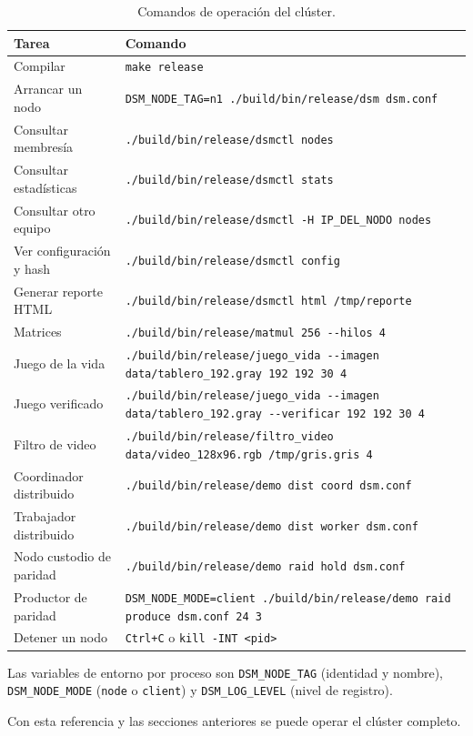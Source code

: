 \begin{table}[H]
\centering
\footnotesize
\caption{Comandos de operación del clúster.}
\label{tab:comandos}
\begin{tabularx}{\textwidth}{@{}P{3.2cm} Y@{}}
\toprule
Tarea & Comando \\
\midrule
Compilar & \texttt{make release} \\
Arrancar un nodo & \texttt{DSM\_NODE\_TAG=n1 ./build/bin/release/dsm dsm.conf} \\
Consultar membresía & \texttt{./build/bin/release/dsmctl nodes} \\
Consultar estadísticas & \texttt{./build/bin/release/dsmctl stats} \\
Consultar otro equipo & \texttt{./build/bin/release/dsmctl -H IP\_DEL\_NODO nodes} \\
Ver configuración y hash & \texttt{./build/bin/release/dsmctl config} \\
Generar reporte HTML & \texttt{./build/bin/release/dsmctl html /tmp/reporte} \\
Matrices & \texttt{./build/bin/release/matmul 256 -{}-hilos 4} \\
Juego de la vida & \texttt{./build/bin/release/juego\_vida -{}-imagen data/tablero\_192.gray 192 192 30 4} \\
Juego verificado & \texttt{./build/bin/release/juego\_vida -{}-imagen data/tablero\_192.gray -{}-verificar 192 192 30 4} \\
Filtro de video & \texttt{./build/bin/release/filtro\_video data/video\_128x96.rgb /tmp/gris.gris 4} \\
Coordinador distribuido & \texttt{./build/bin/release/demo dist coord dsm.conf} \\
Trabajador distribuido & \texttt{./build/bin/release/demo dist worker dsm.conf} \\
Nodo custodio de paridad & \texttt{./build/bin/release/demo raid hold dsm.conf} \\
Productor de paridad & \texttt{DSM\_NODE\_MODE=client ./build/bin/release/demo raid produce dsm.conf 24 3} \\
Detener un nodo & \texttt{Ctrl+C} o \texttt{kill -INT <pid>} \\
\bottomrule
\end{tabularx}
\end{table}

Las variables de entorno por proceso son \texttt{DSM\_NODE\_TAG} (identidad y nombre), \texttt{DSM\_NODE\_MODE} (\texttt{node} o \texttt{client}) y \texttt{DSM\_LOG\_LEVEL} (nivel de registro).

Con esta referencia y las secciones anteriores se puede operar el clúster completo.
